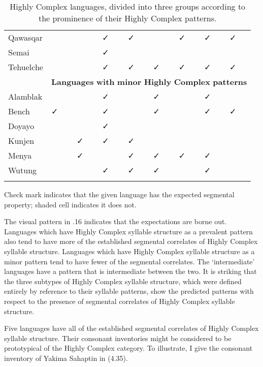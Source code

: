 \begin{table}
\begin{tabularx}{\textwidth}{XXXXXXXXX}
\hhline{~--------}
 Qawasqar &  &  & ✓ & ✓ &  & ✓ & ✓ & ✓\\
\hhline{~--------}
 Semai &  &  & ✓ &  &  &  &  & \\
\hhline{~--------}
 Tehuelche &  &  & ✓ & ✓ & ✓ & ✓ & ✓ & ✓\\
& \multicolumn{8}{c}{ \textbf{Languages} \textbf{with} \textbf{minor} \textbf{Highly} \textbf{Complex} \textbf{patterns}}\\
\hhline{~--------}
 Alamblak &  &  & ✓ &  & ✓ &  & ✓ & \\
\hhline{~--------}
 Bench & ✓ &  & ✓ &  & ✓ &  & ✓ & ✓\\
\hhline{~--------}
 Doyayo &  &  & ✓ &  &  &  &  & \\
\hhline{~--------}
 Kunjen &  & ✓ & ✓ & ✓ &  &  &  & \\
\hhline{~--------}
 Menya &  & ✓ &  & ✓ & ✓ & ✓ & ✓ & \\
\hhline{~--------}
 Wutung &  &  & ✓ & ✓ & ✓ &  & ✓ & \\
\lspbottomrule
\end{tabularx}
\caption{\label{4.16}Highly Complex languages, divided into three groups according to the prominence of their Highly Complex patterns.}Check mark indicates that the given language has the expected segmental property; shaded cell indicates it does not.
\end{table}




  The visual pattern in .16 indicates that the expectations are borne out. Languages which have Highly Complex syllable structure as a prevalent pattern also tend to have more of the established segmental correlates of Highly Complex syllable structure. Languages which have Highly Complex syllable structure as a minor pattern tend to have fewer of the segmental correlates. The ‘intermediate’ languages have a pattern that is intermediate between the two. It is striking that the three subtypes of Highly Complex syllable structure, which were defined entirely by reference to their syllable patterns, show the predicted patterns with respect to the presence of segmental correlates of Highly Complex syllable structure.



  Five languages have all of the established segmental correlates of Highly Complex syllable structure. Their consonant inventories might be considered to be prototypical of the Highly Complex category. To illustrate, I give the consonant inventory of Yakima Sahaptin in (4.35).



